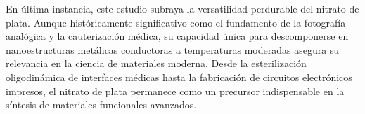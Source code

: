 \documentclass[pdflatex,sn-mathphys-num]{sn-jnl}
\theoremstyle{thmstyleone}%
\theoremstyle{thmstyletwo}%
\theoremstyle{thmstylethree}%
\begin{document}
En última instancia, este estudio subraya la versatilidad perdurable del nitrato
de plata. Aunque históricamente significativo como el fundamento de la
fotografía analógica y la cauterización médica, su capacidad única para
descomponerse en nanoestructuras metálicas conductoras a temperaturas moderadas
asegura su relevancia en la ciencia de materiales moderna. Desde la
esterilización oligodinámica de interfaces médicas hasta la fabricación de
circuitos electrónicos impresos, el nitrato de plata permanece como un precursor
indispensable en la síntesis de materiales funcionales avanzados.


\end{document}
